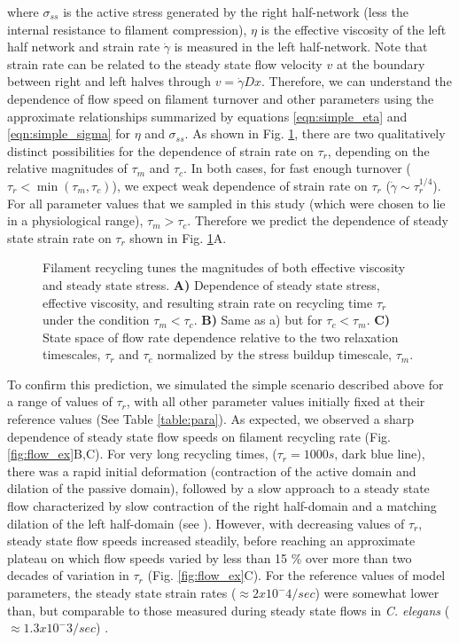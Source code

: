 \documentclass[10pt,letterpaper]{article}
\begin{document}
where $\sigma_{ss}$ is the active stress generated by the right half-network (less the internal resistance to filament compression), $\eta$ is the effective viscosity of the left half network and strain rate $\dot{\gamma}$ is measured in the left half-network.  Note that strain rate can be related to the steady state flow velocity $v$ at the boundary between right and left halves through $ v = \dot{\gamma}Dx$. Therefore, we can understand the dependence of flow speed on filament turnover and other parameters using the approximate relationships summarized by equations \ref{eqn:simple_eta} and \ref{eqn:simple_sigma} for $\eta$ and $\sigma_{ss}$.  As shown in Fig. \ref{fig:flow_theo}, there are two qualitatively distinct possibilities for the dependence of strain rate on $\tau_r$, depending on the relative magnitudes of $\tau_m$ and $\tau_c$.  In both cases, for fast enough turnover ($\tau_r < \min \left (\tau_m, \tau_c \right )$), we expect weak dependence of strain rate on $\tau_r$ ($ \dot{\gamma}\sim \tau_r^{1/4}$).  For all parameter values that we sampled in this study (which were chosen to lie in a physiological range), $\tau_m > \tau_c$. Therefore we predict the dependence of steady state strain rate on $\tau_r$ shown in Fig. \ref{fig:flow_theo}A.


\begin{figure}[h!]
	\centering
	\caption{\label{fig:flow_theo}  Filament recycling tunes the magnitudes of both effective viscosity and steady state stress. \textbf{A)}  Dependence of steady state stress, effective viscosity, and resulting strain rate on recycling time $\tau_r$ under the condition $\tau_{m}<\tau_c$. \textbf{B)} Same as a) but for $\tau_c<\tau_{m}$.  \textbf{C)} State space of flow rate dependence relative to the two relaxation timescales, $\tau_r$ and $\tau_c$ normalized by the stress buildup timescale, $\tau_{m}$.  }
\end{figure}

To confirm this prediction, we simulated the simple scenario described above for a range of values of $\tau_r$, with all other parameter values initially fixed at their reference values (See Table \ref{table:para}). 
As expected, we observed a sharp dependence of steady state flow speeds on filament recycling rate (Fig. \ref{fig:flow_ex}B,C). For very long recycling times, ($\tau_r=1000 s$, dark blue line), there was a rapid initial deformation (contraction of the active domain and dilation of the passive domain), followed by a slow approach to a steady state flow characterized by slow contraction of the right half-domain and a matching dilation of the left half-domain (see ).  
However, with decreasing values of $\tau_r$, steady state flow speeds increased steadily, before reaching an approximate plateau on which flow speeds varied by less than 15 \% over more than two decades of variation in $\tau_r$ (Fig. \ref{fig:flow_ex}C). 
For the reference values of model parameters, the steady state strain rates ($\approx 2x10^-4/sec$) were somewhat lower than, but comparable to those measured during steady state flows in \textit{C. elegans} ($\approx 1.3x10^-3/sec$) \cite{sailer2015}.
\end{document}
